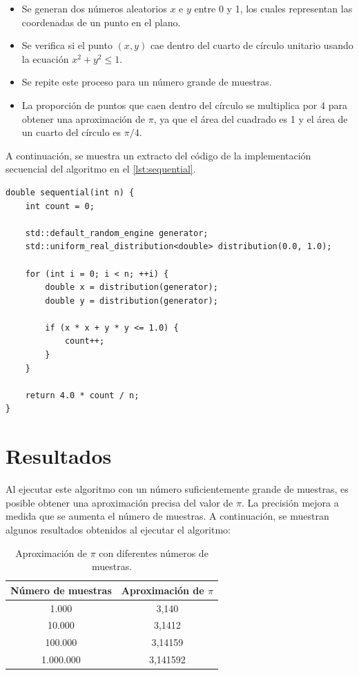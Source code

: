\documentclass[a4paper, 10pt]{IEEEtran}
\begin{document}
\begin{itemize}
    \item Se generan dos números aleatorios $x$ e $y$ entre 0 y 1, los cuales representan las coordenadas de un punto en el plano.
    \item Se verifica si el punto $(x, y)$ cae dentro del cuarto de círculo unitario usando la ecuación $x^2 + y^2 \leq 1$.
    \item Se repite este proceso para un número grande de muestras.
    \item La proporción de puntos que caen dentro del círculo se multiplica por 4 para obtener una aproximación de $\pi$, ya que el área del cuadrado es 1 y el área de un cuarto del círculo es $\pi/4$.
\end{itemize}

\pagebreak

A continuación, se muestra un extracto del código de la implementación secuencial del algoritmo en el \cref{lst:sequential}.

\begin{lstlisting}[caption={Implementación Secuencial de Monte Carlo en C++}, label={lst:sequential}]
double sequential(int n) {
	int count = 0;
	
	std::default_random_engine generator;
	std::uniform_real_distribution<double> distribution(0.0, 1.0);
	
	for (int i = 0; i < n; ++i) {
		double x = distribution(generator);
		double y = distribution(generator);
		
		if (x * x + y * y <= 1.0) {
			count++;
		}
	}
	
	return 4.0 * count / n;
}
\end{lstlisting}

\section{Resultados}
Al ejecutar este algoritmo con un número suficientemente grande de muestras, es posible obtener una aproximación precisa del valor de $\pi$. La precisión mejora a medida que se aumenta el número de muestras. A continuación, se muestran algunos resultados obtenidos al ejecutar el algoritmo:

\begin{table}[H]
    \centering
    \begin{tabular}{|c|c|}
    \hline
    \textbf{Número de muestras} & \textbf{Aproximación de $\pi$} \\
    \hline
    1.000 & 3,140 \\
    10.000 & 3,1412 \\
    100.000 & 3,14159 \\
    1.000.000 & 3,141592 \\
    \hline
    \end{tabular}
    \caption{Aproximación de $\pi$ con diferentes números de muestras.}
    \label{tab:results}
\end{table}
\end{document}
